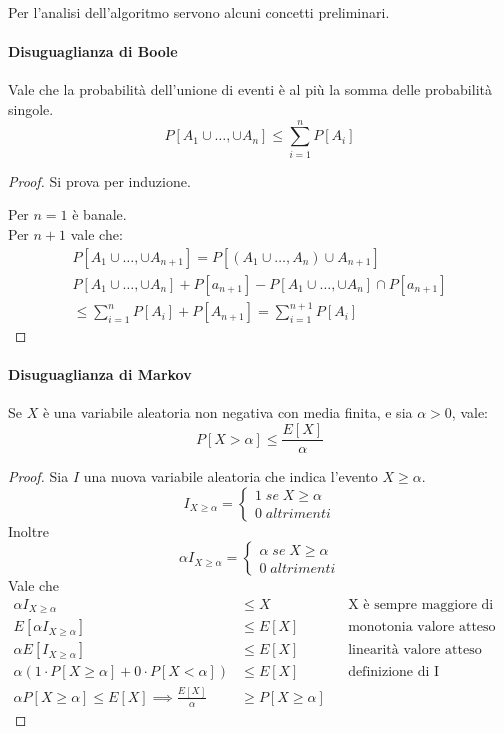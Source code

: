 Per l'analisi dell'algoritmo servono alcuni concetti preliminari.

\paragraph{Disuguaglianza di Boole}
Vale che la probabilità dell'unione di eventi è al più la somma delle probabilità singole.
$$P[A_1 \cup \dots, \cup A_n] \leq \sum_{i =1}^{n}P[A_i]$$
\begin{proof}
    Si prova per induzione.
    
    Per $n=1$ è banale.\\
    Per $n+1$ vale che:
    \begin{equation}
        \begin{aligned}
            P[A_1 \cup \dots, \cup A_{n+1}] = P[(A_1 \cup \dots, A_n)\cup A_{n+1}]\\
            P[A_1 \cup \dots, \cup A_n] + P[a_{n+1}] - P[A_1 \cup \dots, \cup A_n] \cap P[a_{n+1}]\\
            \leq \sum_{i =1}^{n}P[A_i] + P[A_{n+1}] = \sum_{i =1}^{n+1}P[A_i]
        \end{aligned}
    \end{equation}
\end{proof}

\paragraph{Disuguaglianza di Markov}
Se $X$ è una variabile aleatoria non negativa con media finita, e sia $\alpha > 0$, vale:
$$P[X > \alpha] \leq \frac{E[X]}{\alpha}$$
\begin{proof}
    Sia $I$ una nuova variabile aleatoria che indica l'evento $X \geq \alpha$.
    \[
        I_{X \geq \alpha} = 
        \begin{cases}
            1 \; \mathit{se}\; X \geq \alpha\\
            0 \; \mathit{altrimenti}
        \end{cases}\]
    Inoltre
    \[
        \alpha I_{X \geq \alpha} = 
        \begin{cases}
            \alpha \; \mathit{se}\; X \geq \alpha\\
            0 \; \mathit{altrimenti}
        \end{cases}\]
    Vale che
    \begin{equation}
        \begin{aligned}
            \alpha I_{X \geq \alpha} &\leq X && \text{X è sempre maggiore di zero}\\
             E[\alpha I_{X \geq \alpha}] &\leq E[X] && \text{monotonia valore atteso}\\
             \alpha E[ I_{X \geq \alpha}] &\leq E[X] && \text{linearità valore atteso}\\
             \alpha (1\cdot P[X\geq \alpha] + 0\cdot P[X< \alpha]) &\leq E[X] && \text{definizione di I}\\
             \alpha P[X\geq \alpha]\leq E[X] \implies \frac{E[X]}{\alpha} &\geq P[X\geq \alpha]
        \end{aligned}
    \end{equation}
\end{proof}

